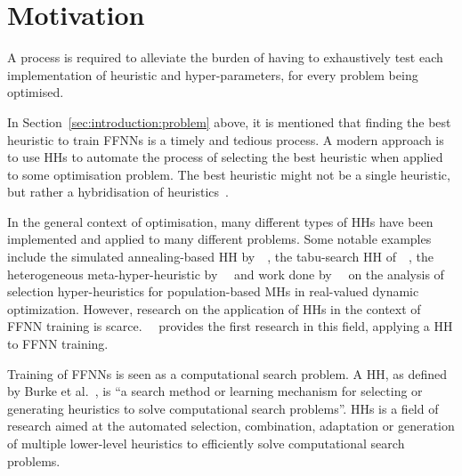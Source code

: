 \section{Motivation}\label{sec:introduction:motivation}

A process is required to alleviate the burden of having to exhaustively test each implementation of heuristic and hyper-parameters, for every problem being optimised.

In Section~\ref{sec:introduction:problem} above, it is mentioned that finding the best heuristic to train \acp{FFNN} is a timely and tedious process. A modern approach is to use \acp{HH} to automate the process of selecting the best heuristic when applied to some optimisation problem. The best heuristic might not be a single heuristic, but rather a hybridisation of heuristics~\cite{ref:pillay:2015}.

In the general context of optimisation, many different types of \acp{HH} have been implemented and applied to many different problems. Some notable examples include the simulated annealing-based \acs{HH} by~\citeauthor{ref:dowsland:2007}~\cite{ref:dowsland:2007}, the tabu-search \acs{HH} of~\citeauthor{ref:burke:2010}~\cite{ref:burke:2010}, the heterogeneous meta-hyper-heuristic by~\citeauthor{ref:grobler:2012}~\cite{ref:grobler:2012} and work done by~\citeauthor{ref:vanderstockt:2018}~\cite{ref:vanderstockt:2018} on the analysis of selection hyper-heuristics for population-based \acp{MH} in real-valued dynamic optimization. However, research on the application of \acp{HH} in the context of \acs{FFNN} training is scarce.~\citeauthor{ref:nel:2021}~\cite{ref:nel:2021} provides the first research in this field, applying a \acs{HH} to \acs{FFNN} training.

Training of \acp{FFNN} is seen as a computational search problem. A \acf{HH}, as defined by Burke et al.~\cite{ref:burke:2010}, is ``a search method or learning mechanism for selecting or generating heuristics to solve computational search problems''. \acp{HH} is a field of research aimed at the automated selection, combination, adaptation or generation of multiple lower-level heuristics to efficiently solve computational search problems.

